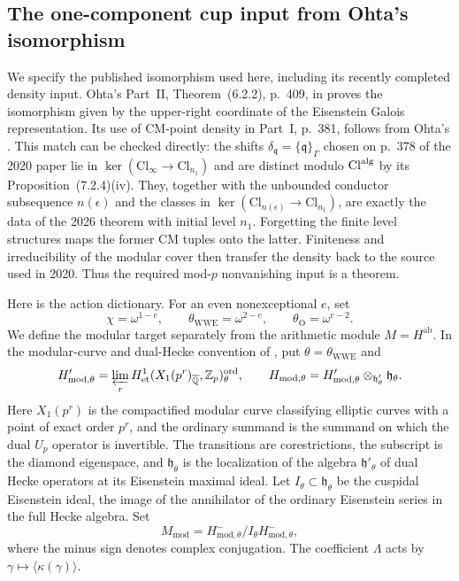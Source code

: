 \subsection{The one-component cup input from Ohta's isomorphism}
\label{subsec:ohta-component-gate}

We specify the published isomorphism used here, including its recently
completed density input.  Ohta's Part~II, Theorem~(6.2.2), p.~409, in \cite{Ohta2020} proves the isomorphism given
by the upper-right coordinate of the Eisenstein Galois representation.
Its use of CM-point density in Part~I, p.~381, follows from Ohta's \cite[Theorem~(2.3.4), author pp.~15--16]{OhtaDensity}.  This match can be checked directly: the shifts
$\delta_{\mathfrak q}=\{\mathfrak q\}_\Gamma$ chosen on p.~378 of the
2020 paper lie in $\ker(\mathrm{Cl}_\infty\to\mathrm{Cl}_{n_1})$ and
are distinct modulo $\mathrm{Cl}^{\rm alg}$ by its
Proposition~(7.2.4)(iv).  They, together with the unbounded conductor
subsequence $n(\epsilon)$ and the classes in
$\ker(\mathrm{Cl}_{n(\epsilon)}\to\mathrm{Cl}_{n_1})$, are exactly the
data of the 2026 theorem with initial level $n_1$.  Forgetting the
finite level structures maps the former CM tuples onto the latter.
Finiteness and irreducibility of the modular cover then transfer the
density back to the source used in 2020.  Thus the required mod-$p$
nonvanishing input is a theorem.

Here is the action dictionary.  For an even nonexceptional $e$, set
\[
 \chi=\omega^{1-e},\qquad
 \theta_{\mathrm{WWE}}=\omega^{2-e},\qquad
 \theta_{\mathrm O}=\omega^{e-2}.
\]
We define the modular target separately from the arithmetic module
$M=H^{\mathrm{ab}}$.  In the modular-curve and dual-Hecke convention of
\cite[\S3.1]{WWEPseudo}, put $\theta=\theta_{\mathrm{WWE}}$ and
\[
 H'_{\mathrm{mod},\theta}
 =\varprojlim_r H^1_{\mathrm{et}}
   (X_1(p^r)_{\overline{\mathbb Q}},\mathbb Z_p)^{\mathrm{ord}}_\theta,
 \qquad
 H_{\mathrm{mod},\theta}
 =H'_{\mathrm{mod},\theta}\otimes_{\mathfrak h'_\theta}\mathfrak h_\theta.
\]
Here $X_1(p^r)$ is the compactified modular curve classifying
elliptic curves with a point of exact order $p^r$, and the ordinary
summand is the summand on which the dual $U_p$ operator is invertible.
The transitions are corestrictions, the subscript is the diamond
eigenspace, and $\mathfrak h_\theta$ is the localization of the algebra
$\mathfrak h'_\theta$ of dual Hecke operators at its Eisenstein maximal
ideal.  Let $I_\theta\subset\mathfrak h_\theta$ be the cuspidal Eisenstein
ideal, the image of the annihilator of the ordinary Eisenstein series
in the full Hecke algebra.  Set
\[
 M_{\mathrm{mod}}
 =H^-_{\mathrm{mod},\theta}/I_\theta H^-_{\mathrm{mod},\theta},
\]
where the minus sign denotes complex conjugation.  The coefficient
$\Lambda$ acts by $\gamma\mapsto\langle\kappa(\gamma)\rangle$.

